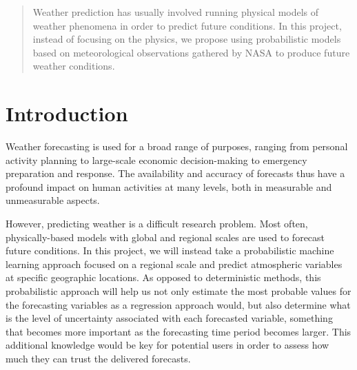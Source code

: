 \documentclass{article}
\begin{document}
 


\begin{abstract} 
Weather prediction has usually involved running physical models of weather
phenomena in order to predict future conditions. In this project, instead of
focusing on the physics, we propose using probabilistic models based on
meteorological observations gathered by NASA to produce future weather
conditions.
\end{abstract} 

\section{Introduction}
\label{submission}

Weather forecasting is used for a broad range of purposes, ranging from personal
activity planning to large-scale economic decision-making to emergency
preparation and response. The availability and accuracy of forecasts thus have a
profound impact on human activities at many levels, both in measurable and
unmeasurable aspects.

However, predicting weather is a difficult research problem. Most often,
physically-based models with global and regional scales are used to forecast
future conditions. In this project, we will instead take a probabilistic machine
learning approach focused on a regional scale and predict atmospheric variables
at specific geographic locations. As opposed to deterministic methods, this
probabilistic approach will help us not only estimate the most probable values
for the forecasting variables as a regression approach would, but also determine
what is the level of uncertainty associated with each forecasted variable,
something that becomes more important as the forecasting time period becomes
larger. This additional knowledge would be key for potential users in order to
assess how much they can trust the delivered forecasts.
\end{document}
